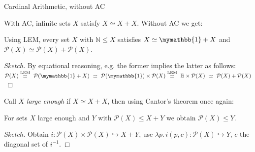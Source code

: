 \documentclass[xcolor=dvipsnames,compress,aspectratio=169]{beamer}
\newcommand{\MBB}[1]{\ensuremath{\mathbb{#1}}\xspace}  %
\newcommand{\MCL}[1]{\ensuremath{\mathcal{#1}}\xspace} %
\newcommand{\Nat}{\MBB{N}}   %
\newcommand{\Bool}{\MBB{B}}  %
\newcommand{\Unit}{\mymathbb{1}}  %
\newcommand{\Pow}{\MCL P}
\begin{document}
\begin{frame}{Cardinal Arithmetic, without AC}

With AC, infinite sets $X$ satisfy $X\simeq X+X$.
\pause
Without AC we get:

\begin{lemma}
	Using LEM, every set $X$ with $\Nat\le X$ satisfies $X\simeq\Unit+X$ and $\Pow(X)\simeq\Pow(X)+\Pow(X)$.
\end{lemma}
\vspace{-0.1cm}
\pause
\begin{proof}[Sketch]
	By equational reasoning, e.g. the former implies the latter as follows:
	$\Pow(X)\overset{\textnormal{LEM}}\simeq~\Pow(\Unit+X)~\simeq~\Pow(\Unit)\times \Pow (X)\overset{\textnormal{LEM}}\simeq~\Bool\times \Pow(X)~\simeq~ \Pow(X)+\Pow(X)$
\end{proof}

\pause
\vspace{0.3cm}
Call $X$ \emph{large enough} if $X\simeq X+X$, then using Cantor's theorem once again:
\begin{lemma}
	For sets $X$ large enough and $Y$ with $\Pow (X)\le X+Y$ we obtain $\Pow (X)\le Y$.
\end{lemma}
\pause
\vspace{-0.1cm}
\begin{proof}[Sketch]
	Obtain $i:\Pow (X)\times\Pow (X)\hookrightarrow X+Y$, use $\lambda p.\, i(p,c):\Pow (X)\hookrightarrow Y$, $c$ the diagonal set of $i^{-1}$.
\end{proof}

\end{frame}
\end{document}
